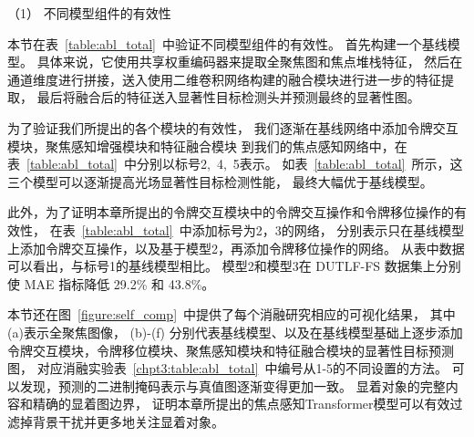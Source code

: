 


（1）
不同模型组件的有效性


本节在表~\ref{table:abl_total}~中验证不同模型组件的有效性。
首先构建一个基线模型。 
具体来说，它使用共享权重编码器来提取全聚焦图和焦点堆栈特征，
然后在通道维度进行拼接，送入使用二维卷积网络构建的融合模块进行进一步的特征提取，
最后将融合后的特征送入显著性目标检测头并预测最终的显著性图。 




为了验证我们所提出的各个模块的有效性，
我们逐渐在基线网络中添加令牌交互模块，聚焦感知增强模块和特征融合模块
到我们的焦点感知网络中，在表~\ref{table:abl_total}~中分别以标号2,~4,~5表示。
如表~\ref{table:abl_total}~所示，这三个模型可以逐渐提高光场显著性目标检测性能，
最终大幅优于基线模型。 




此外，为了证明本章所提出的令牌交互模块中的令牌交互操作和令牌移位操作的有效性，
在表~\ref{table:abl_total}~中添加标号为2，3的网络，
分别表示只在基线模型上添加令牌交互操作，以及基于模型2，再添加令牌移位操作的网络。
从表中数据可以看出，与标号1的基线模型相比。
模型2和模型3在 DUTLF-FS 数据集上分别使 MAE 指标降低 29.2\% 和 43.8\%。 




本节还在图~\ref{figure:self_comp}~中提供了每个消融研究相应的可视化结果，
其中(a)表示全聚焦图像，
(b)-(f) 分别代表基线模型、以及在基线模型基础上逐步添加
令牌交互模块，令牌移位模块、聚焦感知模块和特征融合模块的显著性目标预测图，
对应消融实验表~\ref{chpt3:table:abl_total}~中编号从1-5的不同设置的方法。
可以发现，预测的二进制掩码表示与真值图逐渐变得更加一致。 
显着对象的完整内容和精确的显着图边界，
证明本章所提出的焦点感知Transformer模型可以有效过滤掉背景干扰并更多地关注显着对象。 






